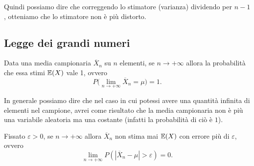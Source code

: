 \noindent Quindi possiamo dire che correggendo lo stimatore (varianza) dividendo per $n - 1$, otteniamo che lo stimatore non è più distorto.

\subsection{Legge dei grandi numeri}
\begin{teorema}
Data una media campionaria $\overline{X}_n$ su $n$ elementi, se $n \to +\infty$ allora la probabilità che essa stimi $\mathbb{E}(X)$ vale 1, ovvero
\[
P\biggl(\lim_{n \to +\infty} \overline{X}_n = \mu \biggr) = 1.
\]
\end{teorema}
\noindent In generale possiamo dire che nel caso in cui potessi avere una quantità infinita di elementi nel campione, avrei come risultato che la media campionaria non è più una variabile aleatoria ma una costante (infatti la probabilità di ciò è $1$).
\begin{teorema}
Fissato $\varepsilon > 0$, se $n \to +\infty$ allora $\overline{X}_n$ non stima mai $\mathbb{E}(X)$ con errore più di $\varepsilon$, ovvero
$$
\lim_{n \to +\infty} P(|\overline{X}_n - \mu| > \varepsilon) = 0.
$$
\end{teorema}


